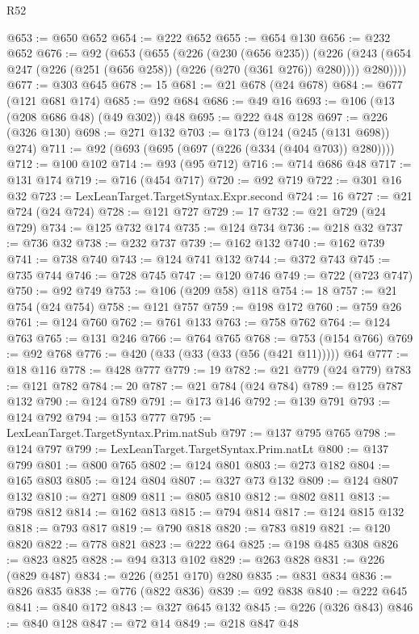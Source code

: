\begin{lexlean}{R52}
\begin{coremodule}
@653 := @650 @652
@654 := @222 @652
@655 := @654 @130
@656 := @232 @652
@676 := @92
    (@653
      (@655
        (@226
          (@230 (@656 @235))
          (@226 (@243 (@654 @247 (@226 (@251 (@656 @258)) (@226 (@270 (@361 @276)) @280)))) @280))))
@677 := @303 @645
@678 := 15
@681 := @21 @678 (@24 @678)
@684 := @677 (@121 @681 @174)
@685 := @92 @684
@686 := @49 @16
@693 := @106 (@13 (@208 @686 @48) (@49 @302)) @48
@695 := @222 @48 @128
@697 := @226 (@326 @130)
@698 := @271 @132
@703 := @173 (@124 (@245 (@131 @698)) @274)
@711 := @92 (@693 (@695 (@697 (@226 (@334 (@404 @703)) @280))))
@712 := @100 @102
@714 := @93 (@95 @712)
@716 := @714 @686 @48
@717 := @131 @174
@719 := @716 (@454 @717)
@720 := @92 @719
@722 := @301 @16 @32
@723 := LexLeanTarget.TargetSyntax.Expr.second
@724 := 16
@727 := @21 @724 (@24 @724)
@728 := @121 @727
@729 := 17
@732 := @21 @729 (@24 @729)
@734 := @125 @732 @174
@735 := @124 @734
@736 := @218 @32
@737 := @736 @32
@738 := @232 @737
@739 := @162 @132
@740 := @162 @739
@741 := @738 @740
@743 := @124 @741 @132
@744 := @372 @743
@745 := @735 @744
@746 := @728 @745
@747 := @120 @746
@749 := @722 (@723 @747)
@750 := @92 @749
@753 := @106 (@209 @58) @118
@754 := 18
@757 := @21 @754 (@24 @754)
@758 := @121 @757
@759 := @198 @172
@760 := @759 @26
@761 := @124 @760
@762 := @761 @133
@763 := @758 @762
@764 := @124 @763
@765 := @131 @246
@766 := @764 @765
@768 := @753 (@154 @766)
@769 := @92 @768
@776 := @420 (@33 (@33 (@33 (@56 (@421 @11))))) @64
@777 := @18 @116
@778 := @428 @777
@779 := 19
@782 := @21 @779 (@24 @779)
@783 := @121 @782
@784 := 20
@787 := @21 @784 (@24 @784)
@789 := @125 @787 @132
@790 := @124 @789
@791 := @173 @146
@792 := @139 @791
@793 := @124 @792
@794 := @153 @777
@795 := LexLeanTarget.TargetSyntax.Prim.natSub
@797 := @137 @795 @765
@798 := @124 @797
@799 := LexLeanTarget.TargetSyntax.Prim.natLt
@800 := @137 @799
@801 := @800 @765
@802 := @124 @801
@803 := @273 @182
@804 := @165 @803
@805 := @124 @804
@807 := @327 @73 @132
@809 := @124 @807 @132
@810 := @271 @809
@811 := @805 @810
@812 := @802 @811
@813 := @798 @812
@814 := @162 @813
@815 := @794 @814
@817 := @124 @815 @132
@818 := @793 @817
@819 := @790 @818
@820 := @783 @819
@821 := @120 @820
@822 := @778 @821
@823 := @222 @64
@825 := @198 @485 @308
@826 := @823 @825
@828 := @94 @313 @102
@829 := @263 @828
@831 := @226 (@829 @487)
@834 := @226 (@251 @170) @280
@835 := @831 @834
@836 := @826 @835
@838 := @776 (@822 @836)
@839 := @92 @838
@840 := @222 @645
@841 := @840 @172
@843 := @327 @645 @132
@845 := @226 (@326 @843)
@846 := @840 @128
@847 := @72 @14
@849 := @218 @847 @48

\end{coremodule}
\end{lexlean}
